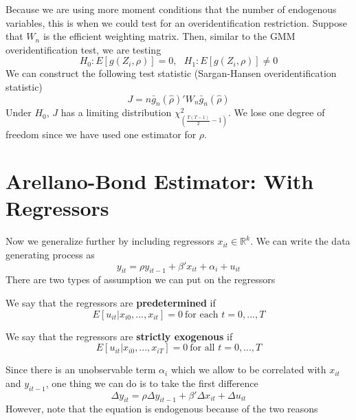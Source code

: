 Because we are using more moment conditions that the number of endogenous variables, this is when we could test for an overidentification restriction. Suppose that $W_n$ is the efficient weighting matrix. Then, similar to the GMM overidentification test, we are testing
\[
H_0: E[g(Z_i,\rho)]=0, \ \ \ H_1: E[g(Z_i,\rho)]\neq0
\]
We can construct the following test statistic (Sargan-Hansen overidentification statistic)
\[
J= n \bar{g}_n(\hat{\rho})'W_n\bar{g}_n(\hat{\rho})
\]
Under $H_0$, $J$ has a limiting distribution $\chi^2_{\left(\frac{T(T-1)}{2}-1\right)}$. We lose one degree of freedom since we have used one estimator for $\rho$. 
\section{Arellano-Bond Estimator: With Regressors}
Now we generalize further by including regressors $x_{it}\in\mathbb{R}^k$. We can write the data generating process as
\[
y_{it}=\rho y_{it-1}+\beta'x_{it}+\alpha_i + u_{it}
\]
There are two types of assumption we can put on the regressors
\begin{mdframed}[backgroundcolor=blue!5] 
\begin{assumption}[Predetermined]
We say that the regressors are \textbf{predetermined} if
\[
E[u_{it}|x_{i0},...,x_{it}]=0 \ \text{for each } t=0,...,T
\]
\end{assumption}
\begin{assumption}
We say that the regressors are \textbf{strictly exogenous} if
\[
E[u_{it}|x_{i0},...,x_{iT}]=0 \ \text{for all } t=0,...,T
\]
\end{assumption}
\end{mdframed}
Since there is an unobservable term $\alpha_i$ which we allow to be correlated with $x_{it}$ and $y_{it-1}$, one thing we can do is to take the first difference
\[
\Delta y_{it}=\rho \Delta y_{it-1}+\beta'\Delta x_{it}+\Delta  u_{it}
\]
However, note that the equation is endogenous because of the two reasons
